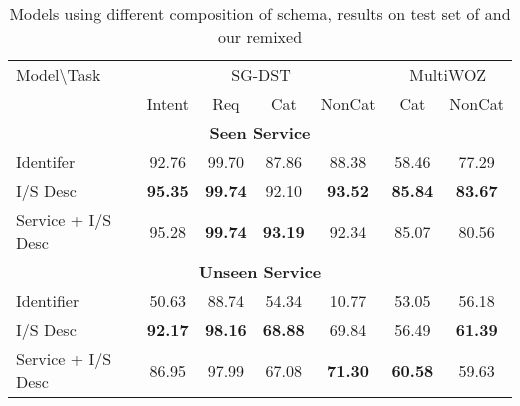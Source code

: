 \begin{table}[!t]
\begin{center}{\scriptsize
\setlength{\tabcolsep}{2pt}
\begin{tabular}{l|cccc|cc}
\toprule
\hline
Model\textbackslash{Task} & \multicolumn{4}{c|}{SG-DST} & \multicolumn{2}{c}{MultiWOZ}                                        \\
                          & Intent                      & Req         & Cat         & NonCat      & Cat         & NonCat      \\ \hline
  \multicolumn{7}{c}{{\bf Seen Service}}                                                                                      \\ \hline
Identifer                 & 92.76                       & 99.70       & 87.86       & 88.38       & 58.46       & 77.29       \\
I/S Desc                  & {\bf 95.35}                 & {\bf 99.74} & 92.10       & {\bf 93.52} & {\bf 85.84} & {\bf 83.67} \\
Service + I/S Desc        & 95.28                       & {\bf 99.74} & {\bf 93.19} & 92.34       & 85.07       & 80.56       \\ \hline
  \multicolumn{7}{c}{{\bf Unseen Service}}                                                                                    \\ \hline
Identifier                & 50.63                       & 88.74       & 54.34       & 10.77       & 53.05       & 56.18       \\
I/S Desc                  & {\bf 92.17}                 & {\bf 98.16} & {\bf 68.88} & 69.84       & 56.49       & {\bf 61.39} \\
Service + I/S Desc        & 86.95                       & 97.99       & 67.08       & {\bf 71.30} & {\bf 60.58} & 59.63       \\
\hline
\bottomrule
\end{tabular}}
\end{center}
\caption{\label{tbl:schema-component-results} Models using different
  composition of schema, results on test set of \sgdst and our remixed \multiwoz %
  }
\end{table}

